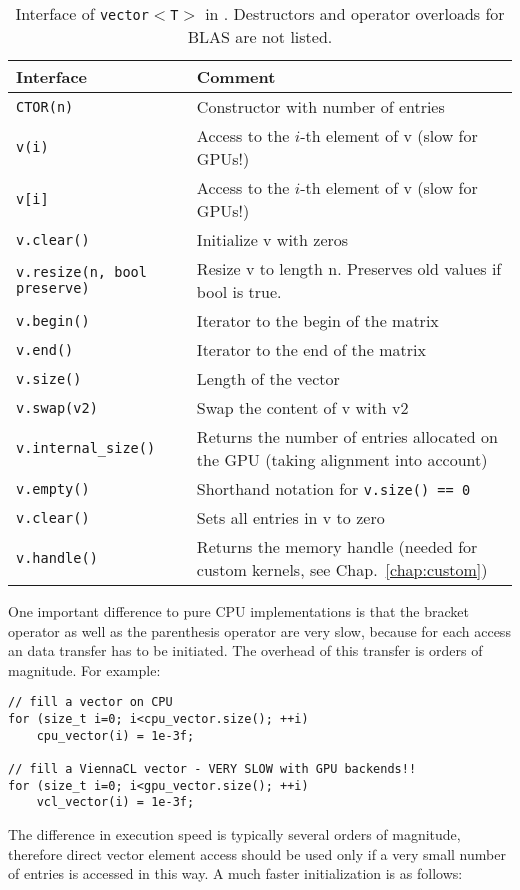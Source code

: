 \begin{table}[tb]
\begin{center}
\begin{tabular}{p{6.5cm}|p{8.5cm}}
Interface & Comment\\
\hline
\texttt{CTOR(n)}    & Constructor with number of entries \\
\texttt{v(i)}       & Access to the $i$-th element of v (slow for GPUs!) \\
\texttt{v[i]}       & Access to the $i$-th element of v (slow for GPUs!) \\
\texttt{v.clear()}  & Initialize v with zeros \\
\texttt{v.resize(n, bool preserve)}    & Resize v to length n. Preserves old values if bool is true. \\
\texttt{v.begin()}  & Iterator to the begin of the matrix \\
\texttt{v.end()}    & Iterator to the end of the matrix \\
\texttt{v.size()}   & Length of the vector \\
\texttt{v.swap(v2)} & Swap the content of v with v2 \\
\texttt{v.internal\_size()} & Returns the number of entries allocated on the GPU (taking alignment into account) \\
\texttt{v.empty()}   & Shorthand notation for \texttt{v.size() == 0} \\
\texttt{v.clear()}   & Sets all entries in v to zero \\
\texttt{v.handle()}  & Returns the memory handle (needed for custom kernels, see Chap.~\ref{chap:custom})
\end{tabular}
\caption{Interface of \texttt{vector$<$T$>$} in \ViennaCL. Destructors and
operator overloads for BLAS are not listed.}
\label{tab:vector-interface}
\end{center}
\end{table}

One important difference to pure CPU implementations is that the bracket operator
as well as the parenthesis operator are very slow, because for each access an {\OpenCL}
data transfer has to be initiated. The overhead of this transfer is orders of
magnitude. For example:
  \begin{lstlisting}
// fill a vector on CPU
for (size_t i=0; i<cpu_vector.size(); ++i)
    cpu_vector(i) = 1e-3f;

// fill a ViennaCL vector - VERY SLOW with GPU backends!!
for (size_t i=0; i<gpu_vector.size(); ++i)
    vcl_vector(i) = 1e-3f;
\end{lstlisting}
The difference in execution speed is typically several orders of magnitude,
therefore direct vector element access should be used only if a very small
number of entries is accessed in this way. A much faster initialization is as
follows:

